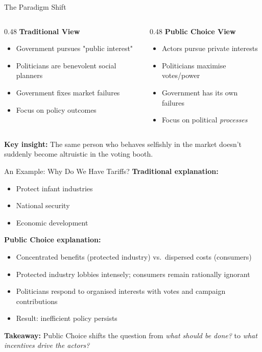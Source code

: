 \documentclass[10pt]{beamer}
\begin{document}
\begin{frame}{The Paradigm Shift}
\begin{columns}
\begin{column}{0.48\textwidth}
\textbf{Traditional View}
\begin{itemize}
\item Government pursues "public interest"
\item Politicians are benevolent social planners
\item Government fixes market failures
\item Focus on policy outcomes
\end{itemize}
\end{column}
\pause
\begin{column}{0.48\textwidth}
\textbf{Public Choice View}
\begin{itemize}
\item Actors pursue private interests
\item Politicians maximise votes/power
\item Government has its own failures
\item Focus on political \textit{processes}
\end{itemize}
\end{column}
\end{columns}

\vspace{0.5cm}
\pause
\textbf{Key insight:} The same person who behaves selfishly in the market doesn't suddenly become altruistic in the voting booth.
\end{frame}

\begin{frame}{An Example: Why Do We Have Tariffs?}
\textbf{Traditional explanation:}
\begin{itemize}
\item Protect infant industries
\item National security
\item Economic development
\end{itemize}

\pause

\textbf{Public Choice explanation:}
\begin{itemize}
\item Concentrated benefits (protected industry) vs.\ dispersed costs (consumers)
\item Protected industry lobbies intensely; consumers remain rationally ignorant
\item Politicians respond to organised interests with votes and campaign contributions
\item Result: inefficient policy persists
\end{itemize}

\pause
\vspace{0.4cm}
\textbf{Takeaway:} Public Choice shifts the question from \textit{what should be done?} to \textit{what incentives drive the actors?}
\end{frame}
\end{document}
